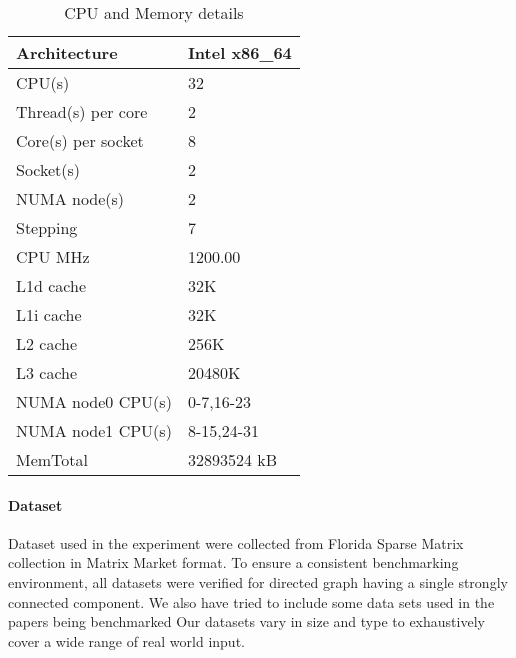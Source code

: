 \begin{table}[th]
\begin{center} %
    \begin{tabular}{| l | l |}
    \hline
    Architecture & Intel x86\_64\\ \hline
    CPU(s) & 32\\ \hline
    Thread(s) per core & 2\\ \hline
	Core(s) per socket & 8\\ \hline
	Socket(s) & 2\\ \hline
	NUMA node(s) & 2\\ \hline
	Stepping & 7\\ \hline
	CPU MHz & 1200.00\\ \hline
	L1d cache & 32K\\ \hline
	L1i cache & 32K\\ \hline
	L2 cache & 256K\\ \hline
	L3 cache & 20480K\\ \hline
	NUMA node0 CPU(s) & 0-7,16-23\\ \hline
	NUMA node1 CPU(s) & 8-15,24-31\\ \hline
	MemTotal & 32893524 kB\\ \hline
    \end{tabular}
\end{center}
\caption{\capfont CPU and Memory details}
\label{tab:Table1}
\end{table}

\paragraph{Dataset}
Dataset used in the experiment were collected from Florida
Sparse Matrix collection in Matrix Market format.  To ensure a
consistent benchmarking environment, all datasets were verified for
directed graph having a single strongly connected component.  We also
have tried to include some data sets used in the papers being benchmarked
Our datasets vary in size and type to exhaustively cover a wide
range of real world input.

